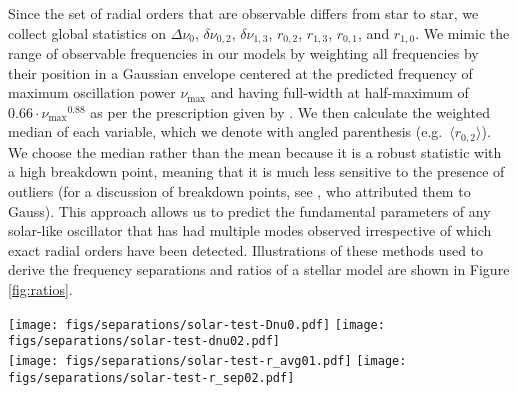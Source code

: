\documentclass[manuscript]{aastex}
\begin{document}
Since the set of radial orders that are observable differs from star to star, we collect global statistics on $\Delta\nu_0$, $\delta\nu_{0,2}$, $\delta\nu_{1,3}$, $r_{0,2}$, $r_{1,3}$, $r_{0,1}$, and $r_{1,0}$. We mimic the range of observable frequencies in our models by weighting all frequencies by their position in a Gaussian envelope centered at the predicted frequency of maximum oscillation power $\nu_{\max}$ and having full-width at half-maximum of $0.66\cdot\nu_{\max}{}^{0.88}$ as per the prescription given by \citet{2012A&A...537A..30M}. We then calculate the weighted median of each variable, which we denote with angled parenthesis (e.g.~$\langle r_{0,2}\rangle$). We choose the median rather than the mean because it is a robust statistic with a high breakdown point, meaning that it is much less sensitive to the presence of outliers (for a discussion of breakdown points, see \citealt{hampel1971general}, who attributed them to Gauss). This approach allows us to predict the fundamental parameters of any solar-like oscillator that has had multiple modes observed irrespective of which exact radial orders have been detected. Illustrations of these methods used to derive the frequency separations and ratios of a stellar model are shown in Figure \ref{fig:ratios}. 

\begin{figure*}
    \centering
    \texttt{[image: figs/separations/solar-test-Dnu0.pdf]}\hfill
    \texttt{[image: figs/separations/solar-test-dnu02.pdf]}\\
    \texttt{[image: figs/separations/solar-test-r\_avg01.pdf]}\hfill
    \texttt{[image: figs/separations/solar-test-r\_sep02.pdf]}%
    \caption{The large and small frequency separations $\Delta\nu_0$ and $\delta\nu_{0,2}$ (top) and frequency ratios $r_{0,1}$ and $r_{0,2}$ (bottom) of a stellar model plotted as a function of frequency. The vertical dotted line indicates $\nu_{\max}$. A $\nu_{\max}$-weighted linear fit is indicated with a dashed diagonal line to guide the eye. Point sizes and colors are proportional to the applied weighting, with blue points having a large influence and red points having little. }%
    \label{fig:ratios}
\end{figure*}
\end{document}
